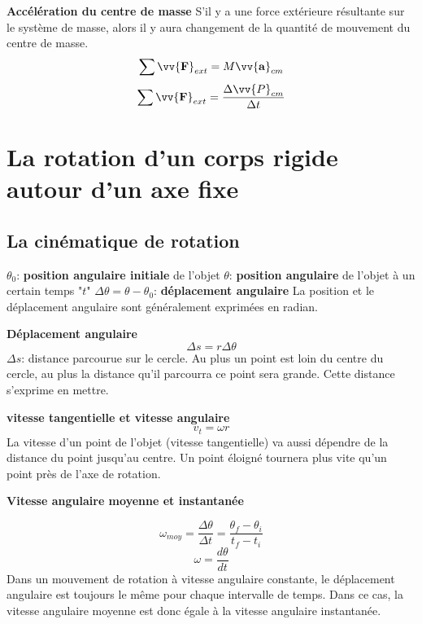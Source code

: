 \documentclass{article}
\begin{document}
\noindent
\textbf{Accélération du centre de masse}
\newline
S'il y a une force extérieure résultante sur le système de masse, alors il y aura changement de la quantité de mouvement du centre de masse.
\[\sum \vv{\mathbf{F}}_{ext} = M\vv{\mathbf{a}}_{cm}\]
\[\sum \vv{\mathbf{F}}_{ext} = \frac{\Delta\vv{P}_{cm}}{\Delta t}\]
\newline

\section{La rotation d'un corps rigide autour d'un axe fixe}
\subsection{La cinématique de rotation}
$\theta_0$: \textbf{position angulaire initiale} de l'objet
\newline
$\theta$: \textbf{position angulaire} de l'objet à un certain temps "$t$"
\newline
$\Delta\theta = \theta - \theta_0$: \textbf{déplacement angulaire}
\newline
La position et le déplacement angulaire sont généralement exprimées en radian.
\newline

\noindent
\textbf{Déplacement angulaire}
\newline
\[\Delta s = r\Delta\theta\]
\newline
$\Delta s$: distance parcourue sur le cercle. Au plus un point est loin du centre du cercle, au plus la distance qu'il parcourra ce point sera grande. Cette distance s'exprime en mettre.
\newline

\noindent
\textbf{vitesse tangentielle et vitesse angulaire}
\[v_t =\omega r\]
La vitesse d'un point de l'objet (vitesse tangentielle) va aussi dépendre de la distance du point jusqu'au centre. Un point éloigné tournera plus vite qu'un point près de l'axe de rotation.
\newline

\noindent
\textbf{Vitesse angulaire moyenne et instantanée}
\newline

\[\omega_{moy} = \frac{\Delta\theta}{\Delta t} = \frac{\theta_f - \theta_i}{t_f - t_i}\]
\[\omega = \frac{d\theta}{dt}\]
\newline
Dans un mouvement de rotation à vitesse angulaire constante, le déplacement angulaire est toujours le même pour chaque intervalle de temps. Dans ce cas, la vitesse angulaire moyenne est donc égale à la vitesse angulaire instantanée.
\newline
\end{document}
